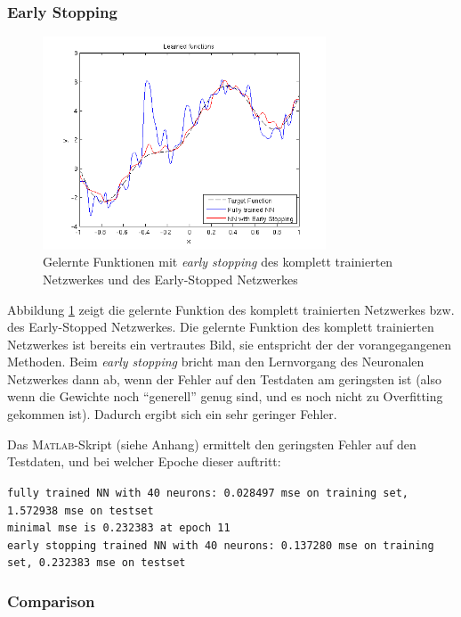 \subsubsection{Early Stopping}

\begin{figure}[h!]
  \centering
  \includegraphics[width=0.75\textwidth]{./figures/3/3_1_learned_es.png}
  \caption{Gelernte Funktionen mit \emph{early stopping} des komplett trainierten Netzwerkes und des Early-Stopped Netzwerkes}
  \label{fig:3_1_learned_es}
\end{figure}

Abbildung \ref{fig:3_1_learned_es} zeigt die gelernte Funktion des komplett trainierten Netzwerkes bzw. des Early-Stopped Netzwerkes. Die gelernte Funktion des komplett trainierten Netzwerkes ist bereits ein vertrautes Bild, sie entspricht der der vorangegangenen Methoden. Beim \emph{early stopping} bricht man den Lernvorgang des Neuronalen Netzwerkes dann ab, wenn der Fehler auf den Testdaten am geringsten ist (also wenn die Gewichte noch ``generell'' genug sind, und es noch nicht zu Overfitting gekommen ist). Dadurch ergibt sich ein sehr geringer Fehler.

Das \textsc{Matlab}-Skript (siehe Anhang) ermittelt den geringsten Fehler auf den Testdaten, und bei welcher Epoche dieser auftritt:

\noindent \texttt{fully trained NN with 40 neurons: 0.028497 mse on training set, 1.572938 mse on testset\\
minimal mse is 0.232383 at epoch 11\\
early stopping trained NN with 40 neurons: 0.137280 mse on training set, 0.232383 mse on testset}


\subsubsection{Comparison}

